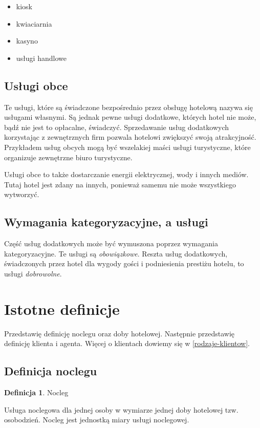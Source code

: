 \documentclass[a4paper,onecolumn,oneside,11pt,wide,floatssmall]{mwrep}
\theoremstyle{definition}
\newtheorem{defn}{Definicja}[section]
\theoremstyle{plain}%
\theoremstyle{remark}
\begin{document}
\begin{itemize}
  \item kiosk
  \item kwiaciarnia
  \item kasyno
  \item usługi handlowe
\end{itemize}

\subsection{Usługi obce}
Te usługi, które są świadczone bezpośrednio przez obsługę hotelową nazywa 
się usługami własnymi. Są jednak pewne usługi dodatkowe, których hotel nie 
może, bądź nie jest to opłacalne, świadczyć. Sprzedawanie usług dodatkowych 
korzystając z zewnętrznych firm pozwala hotelowi zwiększyć swoją \mbox{atrakcyjność.} Przykładem usług obcych mogą być wszelakiej maści usługi turystyczne, 
które organizuje zewnętrzne biuro turystyczne.

Usługi obce to także dostarczanie energii elektrycznej, wody i innych mediów.
 Tutaj hotel jest zdany na innych, ponieważ samemu nie może wszystkiego 
wytworzyć.

\subsection{Wymagania kategoryzacyjne, a usługi}
Część usług dodatkowych może być wymuszona poprzez wymagania kategoryzacyjne.
 Te usługi są \emph{obowiązkowe}. Reszta usług dodatkowych, świadczonych 
 przez hotel dla wygody gości i podniesienia prestiżu 
 hotelu, to usługi \emph{dobrowolne}.

\section{Istotne definicje}
Przedstawię definicję noclegu oraz doby hotelowej. Następnie przedstawię 
definicję klienta i agenta. Więcej o klientach dowiemy się w
 \ref{rodzaje-klientow}.

\subsection{Definicja noclegu}

\begin{defn}{Nocleg}

Usługa noclegowa dla jednej osoby w wymiarze jednej doby hotelowej tzw. 
osobodzień. Nocleg jest jednostką miary usługi noclegowej.

\end{defn} 
\end{document}
